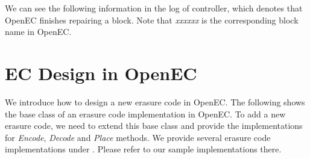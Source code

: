 \documentclass[letterpaper,12pt]{article}
\newcommand{\openec}{{\sf\small OpenEC}\xspace}
\begin{document}
We can see the following information in the log of controller, which denotes
that \openec finishes repairing a block.  Note that {\sl xxxxxx} is the
corresponding block name in \openec.

\begin{center}
\noindent{}
\end{center}

\section{EC Design in OpenEC}
\label{sec:ecdesign}

We introduce how to design a new erasure code in \openec. The following shows
the base class of an erasure code implementation in \openec. To add a new
erasure code, we need to extend this base class and provide the
implementations for {\sl Encode}, {\sl Decode} and {\sl Place} methods. We
provide several erasure code implementations under .
Please refer to our sample implementations there.

\begin{center}
\noindent{}

\end{center}
\end{document}
